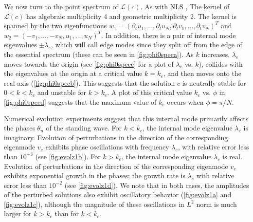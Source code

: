 \documentclass[11pt,reqno]{amsart}
\def\calL{{\mathcal L}}
\begin{document}
We now turn to the point spectrum of $\calL(c)$. As with NLS \cite[Chapter 2.1.1.1]{Kevrekidis2009},
The kernel of $\calL(c)$ has algebraic multiplicity 4 and geometric multiplicity 2. The kernel is spanned by the two eigenfunctions 
$w_1 = (\partial_t u_1, \dots, \partial_t u_N, \partial_t v_1, \dots, \partial_t v_N )^T$ and 
$w_2 = (-v_1, \dots, -v_N, u_1, \dots, u_N )^T$. In addition, there is a pair of internal mode eigenvalues $\pm \lambda_e$, which will call edge modes since they split off from the edge of the essential spectrum (these can be seen in \cref{fig:phi0speca}). As $k$ increases, $\lambda_e$ moves towards the origin (see \cref{fig:phi0specc} for a plot of $\lambda_e$ vs. $k$), collides with the eigenvalues at the origin at a critical value $k = k_e$, and then moves onto the real axis (\cref{fig:phi0specb}). This suggests that the solution $c$ is neutrally stable for $0 < k < k_e$ and unstable for $k > k_e$. A plot of this critical value $k_e$ vs. $\phi$ in \cref{fig:phi0specd} suggests that the maximum value of $k_e$ occurs when $\phi = \pi/N$.

Numerical evolution experiments suggest that this internal mode primarily affects the phases $\theta_n$ of the standing wave. For $k < k_e$, the internal mode eigenvalue $\lambda_e$ is imaginary. Evolution of perturbations in the direction of the corresponding eigenmode $v_e$ exhibits phase oscillations with frequency $\lambda_e$, with relative error less than $10^{-3}$ (see \cref{fig:evolz1b}). For $k > k_e$, the internal mode eigenvalue $\lambda_e$ is real. Evolution of perturbations in the direction of the corresponding eigenmode $v_e$ exhibits exponential growth in the phases; the growth rate is $\lambda_e$ with relative error less than $10^{-2}$ (see \cref{fig:evolz1d}). We note that in both cases, the amplitudes of the perturbed solutions also exhibit oscillatory behavior (\cref{fig:evolz1a} and \cref{fig:evolz1c}), although the magnitude of these oscillations in $L^2$ norm is much larger for $k > k_e$ than for $k < k_e$.
\end{document}
